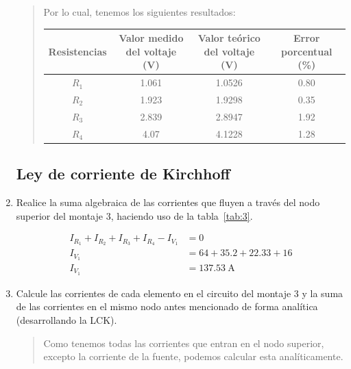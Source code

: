 \documentclass{article}
\begin{document}
\begin{enumerate}[label=\alph*.-]
\begin{quote}
            Por lo cual, tenemos los siguientes resultados:
            
            \begin{table}[ht]
                \centering
                \begin{tabular}{|c|c|c|c|} %
                    \midrule 
                    Resistencias    & Valor medido del voltaje (\unit{\volt})   & Valor teórico del voltaje (\unit{\volt})  & Error porcentual (\%)\\
                    \midrule
                    $R_1$           & 1.061 & 1.0526    & 0.80  \\
                    $R_2$           & 1.923 & 1.9298    & 0.35  \\
                    $R_3$           & 2.839 & 2.8947    & 1.92  \\
                    $R_4$           & 4.07  & 4.1228    & 1.28  \\
                    \midrule
                \end{tabular}
            \end{table}
            
        \end{quote}
        
        \subsection*{Ley de corriente de Kirchhoff}
        \item Realice la suma algebraica de las corrientes que fluyen a través del nodo superior del montaje 3, haciendo uso de la tabla~\ref{tab:3}.
        
        \begin{align*}
            I_{R_1} + I_{R_2} + I_{R_3} + I_{R_4} - I_{V_1} &= 0\\
            I_{V_1} &= 64 + 35.2 + 22.33 + 16\\
            I_{V_1} &= \SI{137.53}{\ampere}
        \end{align*}
        
        \item Calcule las corrientes de cada elemento en el circuito del montaje 3 y la suma de las corrientes en el mismo nodo antes mencionado de forma analítica (desarrollando la LCK).
        
        \begin{quote}
            Como tenemos todas las corrientes que entran en el nodo superior, excepto la corriente de la fuente, podemos calcular esta analíticamente.


\end{quote}
\end{enumerate}
\end{document}
